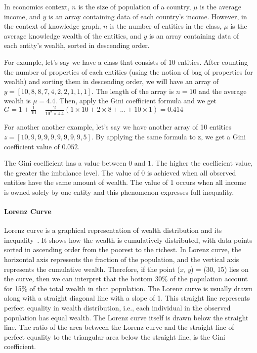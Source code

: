In economics context, \(n\) is the size of population of a country, $\mu$ is the average income, and \(y\) is an array containing data of each country's income. However, in the context of knowledge graph, \(n\) is the number of entities in the class, $\mu$ is the average knowledge wealth of the entities, and \(y\) is an array containing data of each entity's wealth, sorted in descending order.

For example, let's say we have a class that consists of 10 entities. After counting the number of properties of each entities (using the notion of bag of properties for wealth) and sorting them in descending order, we will have an array of \(y = [10,8,8,7,4,2,2,1,1,1]\). The length of the array is \(n = 10\) and the average wealth is \(\mu = 4.4\). Then, apply the Gini coefficient formula and we get \(G = 1 + \frac{1}{10} - \frac{2}{10^{2}\times4.4}(1\times10 + 2\times8 + ... + 10\times1) = 0.414\)

For another another example, let's say we have another array of 10 entities \(z = [10, 9, 9, 9, 9, 9, 9, 9, 9, 5]\). By applying the same formula to z, we get a Gini coefficient value of \(0.052\).

The Gini coefficient has a value between \(0\) and \(1\). The higher the coefficient value, the greater the imbalance level. The value of 0 is achieved when all observed entities have the same amount of wealth. The value of 1 occurs when all income is owned solely by one entity and this phenomenon expresses full inequality.


\paragraph{Lorenz Curve} Lorenz curve is a graphical representation of wealth distribution and its inequality~\cite{Kakwani1977}. It shows how the wealth is cumulatively distributed, with data points sorted in ascending order from the poorest to the richest. In Lorenz curve, the horizontal axis represents the fraction of the population, and the vertical axis represents the cumulative wealth. Therefore, if the point (\textit{x}, \textit{y}) = (30, 15) lies on the curve, then we can interpret that the bottom 30\% of the population account for 15\% of the total wealth in that population. The Lorenz curve is usually drawn along with a straight diagonal line with a slope of 1. This straight line represents perfect equality in wealth distribution, i.e., each individual in the observed population has equal wealth. The Lorenz curve itself is drawn below the straight line. The ratio of the area between the Lorenz curve and the straight line of perfect equality to the triangular area below the straight line, is the Gini coefficient.